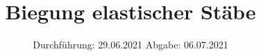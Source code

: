 

\subject{V103}
\title{Biegung elastischer Stäbe}
\date{%
  Durchführung: 29.06.2021
  \hspace{3em}
  Abgabe: 06.07.2021
}



\maketitle
\thispagestyle{empty}
\tableofcontents
\newpage







\printbibliography{}


